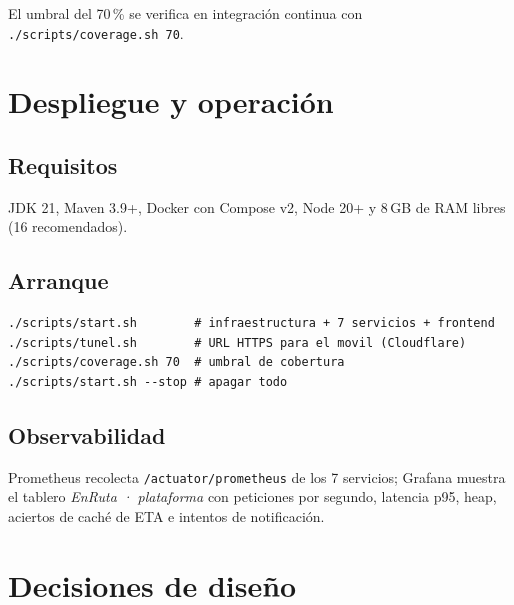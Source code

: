 \documentclass[10pt,letterpaper,twocolumn,oneside]{report}
\newcommand{\pkg}[1]{\texttt{#1}}
\begin{document}
El umbral del 70\,\% se verifica en integración continua con \pkg{./scripts/coverage.sh 70}.

\chapter{Despliegue y operación}

\section{Requisitos}

JDK 21, Maven 3.9+, Docker con Compose v2, Node 20+ y 8\,GB de RAM libres (16 recomendados).

\section{Arranque}

\begin{verbatim}
./scripts/start.sh        # infraestructura + 7 servicios + frontend
./scripts/tunel.sh        # URL HTTPS para el movil (Cloudflare)
./scripts/coverage.sh 70  # umbral de cobertura
./scripts/start.sh --stop # apagar todo
\end{verbatim}

\section{Observabilidad}

Prometheus recolecta \pkg{/actuator/prometheus} de los 7 servicios; Grafana muestra el tablero
\emph{EnRuta · plataforma} con peticiones por segundo, latencia p95, heap, aciertos de caché de
ETA e intentos de notificación.

\chapter{Decisiones de diseño}
\end{document}
